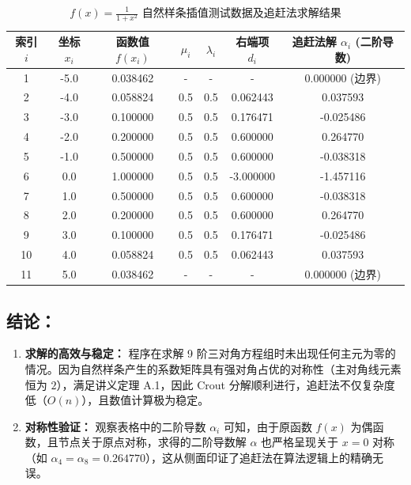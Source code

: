 \documentclass{article}
\begin{document}
\begin{table}[H]
    \centering
    \caption{$f(x)=\frac{1}{1+x^2}$ 自然样条插值测试数据及追赶法求解结果}
    \begin{tabular}{ccccccc}
        \toprule
        索引 $i$ & 坐标 $x_i$ & 函数值 $f(x_i)$ & $\mu_i$ & $\lambda_i$ & 右端项 $d_i$ & 追赶法解 $\alpha_i$ (二阶导数) \\
        \midrule
        1  & -5.0 & 0.038462 & -   & -   & -        & 0.000000 (边界) \\
        2  & -4.0 & 0.058824 & 0.5 & 0.5 & 0.062443 & 0.037593 \\
        3  & -3.0 & 0.100000 & 0.5 & 0.5 & 0.176471 & -0.025486 \\
        4  & -2.0 & 0.200000 & 0.5 & 0.5 & 0.600000 & 0.264770 \\
        5  & -1.0 & 0.500000 & 0.5 & 0.5 & 0.600000 & -0.038318 \\
        6  &  0.0 & 1.000000 & 0.5 & 0.5 & -3.000000& -1.457116 \\
        7  &  1.0 & 0.500000 & 0.5 & 0.5 & 0.600000 & -0.038318 \\
        8  &  2.0 & 0.200000 & 0.5 & 0.5 & 0.600000 & 0.264770 \\
        9  &  3.0 & 0.100000 & 0.5 & 0.5 & 0.176471 & -0.025486 \\
        10 &  4.0 & 0.058824 & 0.5 & 0.5 & 0.062443 & 0.037593 \\
        11 &  5.0 & 0.038462 & -   & -   & -        & 0.000000 (边界) \\
        \bottomrule
    \end{tabular}
\end{table}

\subsection{结论：}
\begin{enumerate}
    \item \textbf{求解的高效与稳定：} 程序在求解 9 阶三对角方程组时未出现任何主元为零的情况。因为自然样条产生的系数矩阵具有强对角占优的对称性（主对角线元素恒为 $2$），满足讲义定理 A.1，因此 Crout 分解顺利进行，追赶法不仅复杂度低（$O(n)$），且数值计算极为稳定。
    \item \textbf{对称性验证：} 观察表格中的二阶导数 $\alpha_i$ 可知，由于原函数 $f(x)$ 为偶函数，且节点关于原点对称，求得的二阶导数解 $\alpha$ 也严格呈现关于 $x=0$ 对称（如 $\alpha_4 = \alpha_8 = 0.264770$），这从侧面印证了追赶法在算法逻辑上的精确无误。
\end{enumerate}
\end{document}
